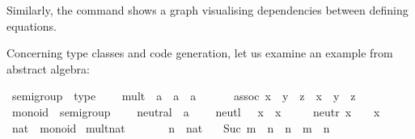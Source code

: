 \begin{isabellebody}
\begin{isamarkuptext}
  Similarly, the \hyperlink{command.code-deps}{\mbox{}} command shows a graph
  visualising dependencies between defining equations.%
\end{isamarkuptext}%
\isamarkuptrue%
%
\isamarkuptrue%
%
\begin{isamarkuptext}%
Concerning type classes and code generation, let us examine an example
  from abstract algebra:%
\end{isamarkuptext}%
\isamarkuptrue%
%
\isadelimquote
%
\endisadelimquote
%
\isatagquote
{}\isamarkupfalse%
\ semigroup\ {\isacharequal}\ type\ {\isacharplus}\isanewline
\ \ \ mult\ {\isacharcolon}{\isacharcolon}\ {\isachardoublequoteopen}{\isacharprime}a\ {\isasymRightarrow}\ {\isacharprime}a\ {\isasymRightarrow}\ {\isacharprime}a{\isachardoublequoteclose}\ {\isacharparenleft}\ {\isachardoublequoteopen}{\isasymotimes}{\isachardoublequoteclose}\ {}{}{\isacharparenright}\isanewline
\ \ \ assoc{\isacharcolon}\ {\isachardoublequoteopen}{\isacharparenleft}x\ {\isasymotimes}\ y{\isacharparenright}\ {\isasymotimes}\ z\ {\isacharequal}\ x\ {\isasymotimes}\ {\isacharparenleft}y\ {\isasymotimes}\ z{\isacharparenright}{\isachardoublequoteclose}\isanewline
\isanewline
{}\isamarkupfalse%
\ monoid\ {\isacharequal}\ semigroup\ {\isacharplus}\isanewline
\ \ \ neutral\ {\isacharcolon}{\isacharcolon}\ {\isacharprime}a\ {\isacharparenleft}{\isachardoublequoteopen}{\isasymone}{\isachardoublequoteclose}{\isacharparenright}\isanewline
\ \ \ neutl{\isacharcolon}\ {\isachardoublequoteopen}{\isasymone}\ {\isasymotimes}\ x\ {\isacharequal}\ x{\isachardoublequoteclose}\isanewline
\ \ \ \ \ neutr{\isacharcolon}\ {\isachardoublequoteopen}x\ {\isasymotimes}\ {\isasymone}\ {\isacharequal}\ x{\isachardoublequoteclose}\isanewline
\isanewline
{}\isamarkupfalse%
\ nat\ {\isacharcolon}{\isacharcolon}\ monoid\isanewline
{}\isanewline
\isanewline
{}\isamarkupfalse%
\ mult{\isacharunderscore}nat\ \isanewline
\ \ \ \ {\isachardoublequoteopen}{}\ {\isasymotimes}\ n\ {\isacharequal}\ {\isacharparenleft}{}{\isasymColon}nat{\isacharparenright}{\isachardoublequoteclose}\isanewline
\ \ {\isacharbar}\ {\isachardoublequoteopen}Suc\ m\ {\isasymotimes}\ n\ {\isacharequal}\ n\ {\isacharplus}\ m\ {\isasymotimes}\ n{\isachardoublequoteclose}\isanewline

\end{isabellebody}
